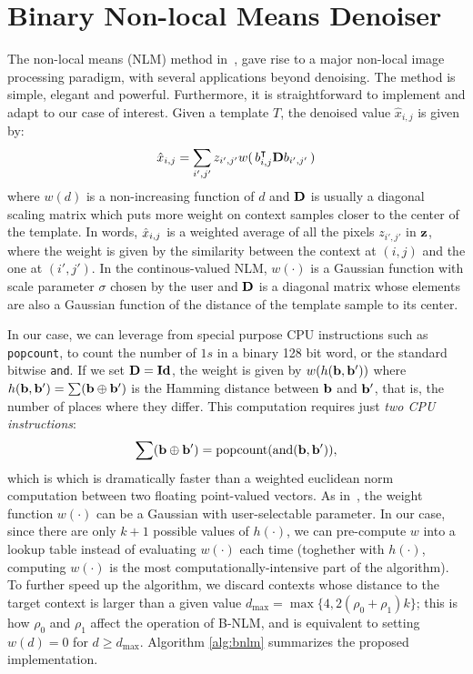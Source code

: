 \documentclass{article}
\begin{document}
\section{Binary Non-local Means Denoiser} 
\label{sec:bnlm}
\def\mD{\mat{D}}
The non-local means (NLM) method in~\cite{nlm}, gave rise to  a major   non-local image processing paradigm, with several applications beyond denoising. The method is simple, elegant and powerful. Furthermore, it is straightforward to implement and adapt to our case of interest. Given a template $T$, the denoised value $\hat{x}_{i,j}$ is given by:
$$\hx_{i,j} = \sum_{i',j'} z_{i',j'} w(\,b_{i,j}\transp\mD b_{i',j'}\,)$$ 
where $w(d)$ is a non-increasing function of $d$ and $\mD$ is usually a diagonal scaling matrix which puts more weight on context samples closer to the center of the template. In words, $\hat{x}_{i,j}$ is a weighted average of all the pixels $z_{i',j'}$ in $\vz$, where the weight is given by the similarity between the context at $(i,j)$ and the one at $(i',j')$. In the continous-valued NLM, $w(\cdot)$ is a Gaussian function with scale parameter $\sigma$ chosen by the user and $\mD$ is a diagonal matrix whose elements are also a Gaussian function of the distance of the template sample to its center. 

In our case, we can leverage from special purpose CPU instructions such as \texttt{popcount}, to count the number of $1s$ in a binary 128 bit word, or the standard bitwise \texttt{and}. If we set $\mD=\mathbf{Id}$, the weight is given by $w(h(\vb,\vb'))$ where $h(\vb,\vb')=\sum(\vb \oplus \vb')$ is the Hamming distance between $\vb$ and $\vb'$, that is, the number of places where they differ. This computation requires just \emph{two CPU instructions}: $$\sum(\vb \oplus \vb')=\mathrm{popcount}(\mathrm{and}(\vb,\vb')),$$ which is which is dramatically faster than a weighted euclidean norm computation between two floating point-valued vectors. As in~\cite{nlm}, the weight function $w(\cdot)$ can be  a Gaussian with user-selectable parameter. In our case, since there are only $k+1$ possible values of $h(\cdot)$, we can pre-compute $w$ into a lookup table instead of evaluating $w(\cdot)$ each time (toghether with $h(\cdot)$, computing $w(\cdot)$ is the most computationally-intensive part of the algorithm).
To further speed up the algorithm, we discard contexts whose distance to the target context is larger than a given value $d_{\max}=\max\{4,2(\rho_0+\rho_1)k\}$; this is how $\rho_0$ and $\rho_1$ affect the operation of B-NLM, and is equivalent to setting $w(d)=0$ for $d\geq d_{\max}$.
Algorithm \ref{alg:bnlm} summarizes the proposed implementation.
\end{document}
